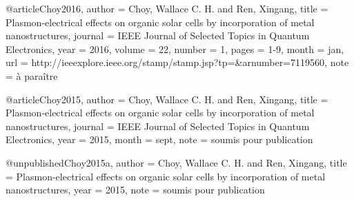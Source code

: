 @article{Choy2016,
author = {Choy, Wallace C. H. and Ren, Xingang},
title = {Plasmon-electrical effects on organic solar cells by incorporation of metal nanostructures},
journal = {{IEEE} Journal of Selected Topics in Quantum Electronics},
year = {2016},
volume = {22},
number = {1},
pages = {1-9},
month = jan,
url = {http://ieeexplore.ieee.org/stamp/stamp.jsp?tp=&arnumber=7119560},
note = {à paraître}		
}






@article{Choy2015,
author = {Choy, Wallace C. H. and Ren, Xingang},
title = {Plasmon-electrical effects on organic solar cells by incorporation of metal nanostructures},
journal = {{IEEE} Journal of Selected Topics in Quantum Electronics},
year = {2015},
month = sept,
note = {soumis pour publication}
}





@unpublished{Choy2015a,
author = {Choy, Wallace C. H. and Ren, Xingang},
title = {Plasmon-electrical effects on organic solar cells by incorporation of metal nanostructures},
year = {2015},
note = {soumis pour publication}
}






